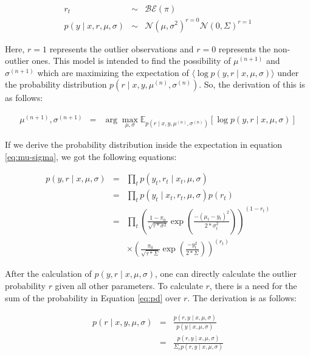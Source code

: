 \begin{eqnarray}
    r_t &\sim& \mathcal{BE}(\pi) \\
    p\left(y \mid x,r,\mu,\sigma\right) &\sim &\mathcal{N}\left(\mu,\sigma^2\right)^{r=0} \mathcal{N}\left(0,\Sigma\right)^{r=1}
\end{eqnarray}

Here, $r = 1$ represents the outlier observations and $r = 0$ represents the non-outlier ones. 
This model is intended to find the possibility of  $\mu^{(n+1)}$ and $\sigma^{(n+1)}$ which are maximizing the expectation of $\langle \log p\left(y,r\mid x,\mu,\sigma\right)\rangle$ under the probability distribution $p\left(r\mid x,y,\mu^{(n)},\sigma^{(n)}\right)$. So, the derivation of this is as follows:

\begin{eqnarray}
    \mu^{(n+1)},\sigma^{(n+1)}&=&\arg\max_{\mu,\sigma}\mathbb{E}_{p\left(r\mid x,y,\mu^{(n)},\sigma^{(n)}\right)} \left[\log p\left(y,r\mid x,\mu,\sigma\right)\right] \label{eq:mu-sigma}
\end{eqnarray}

If we derive the probability distribution inside the expectation in equation \ref{eq:mu-sigma}, we got the following equations:

\begin{eqnarray}
    p\left(y,r\mid x,\mu,\sigma\right) &=& \prod_t p\left(y_t,r_t\mid x_t,\mu,\sigma\right) \\
    &=&\prod_t p\left(y_t\mid x_t,r_t,\mu,\sigma\right)p\left(r_t\right) \\
    &=&\prod_t \left(\frac{1-\pi_0}{\sqrt{\tau*\sigma^2}}\exp\left(\frac{-(\mu_t-y_t)^2}{2*\sigma_t^2}\right)\right)^{(1-r_t)} \\
    & &\times\left(\frac{\pi_0}{\sqrt{\tau*\Sigma}}\exp\left(\frac{-y_t^2}{2*\Sigma}\right)\right)^{(r_t)} \label{eq:pd}
\end{eqnarray}

After the calculation of $p\left(y,r\mid x,\mu,\sigma\right)$, one can directly calculate the outlier probability $r$ given all other parameters. To calculate $r$, there is a need for the sum of the probability in Equation \ref{eq:pd} over $r$.
The derivation is as follows:

\begin{eqnarray}
    p\left(r\mid x,y,\mu,\sigma\right) &=& \frac{p\left(r,y\mid x,\mu,\sigma\right)}{p\left(y\mid x,\mu,\sigma\right)} \\
    &=& \frac{p\left(r,y\mid x,\mu,\sigma\right)}{\Sigma_r p\left(r,y\mid x,\mu,\sigma \right)}
\end{eqnarray}

